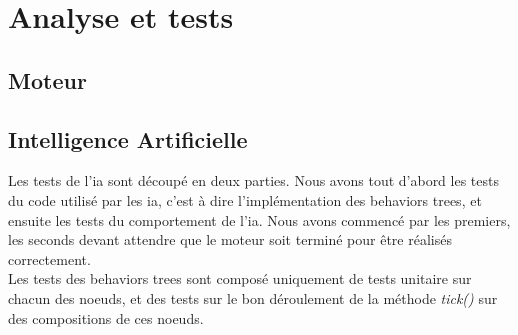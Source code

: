 \section{Analyse et tests}

\subsection{Moteur}

\subsection{Intelligence Artificielle}
Les tests de l'ia sont découpé en deux parties. Nous avons tout d'abord les tests du code utilisé par les ia, c'est à dire l'implémentation des behaviors trees, et ensuite les tests du comportement de l'ia. Nous avons commencé par les premiers, les seconds devant attendre que le moteur soit terminé pour être réalisés correctement. \\

Les tests des behaviors trees sont composé uniquement de tests unitaire sur chacun des noeuds, et des tests sur le bon déroulement de la méthode \textit{tick()} sur des compositions de ces noeuds.